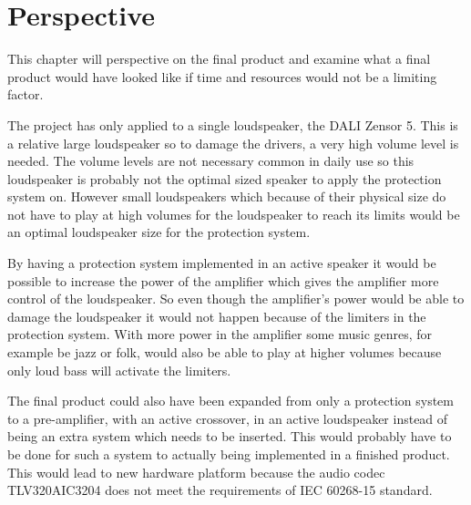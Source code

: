 \chapter{Perspective}
This chapter will perspective on the final product and examine what a final product would have looked like if time and resources would not be a limiting factor.

The project has only applied to a single loudspeaker, the DALI Zensor 5. This is a relative large loudspeaker so to damage the drivers, a very high volume level is needed. The volume levels are not necessary common in daily use so this loudspeaker is probably not the optimal sized speaker to apply the protection system on. However small loudspeakers which because of their physical size do not have to play at high volumes for the loudspeaker to reach its limits would be an optimal loudspeaker size for the protection system. 

By having a protection system implemented in an active speaker it would be possible to increase the power of the amplifier which gives the amplifier more control of the loudspeaker. So even though the amplifier's power would be able to damage the loudspeaker it would not happen because of the limiters in the protection system. With more power in the amplifier some music genres, for example be jazz or folk, would also be able to play at higher volumes because only loud bass will activate the limiters. 

The final product could also have been expanded from only a protection system to a pre-amplifier, with an active crossover, in an active loudspeaker instead of being an extra system which needs to be inserted. This would probably have to be done for such a system to actually being implemented in a finished product. This would lead to new hardware platform because the audio codec TLV320AIC3204 does not meet the requirements of IEC 60268-15 standard.  

